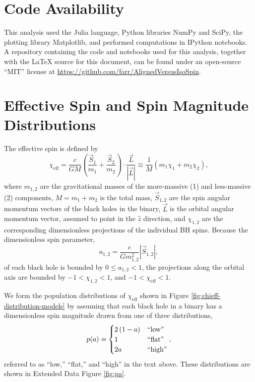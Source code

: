 \documentclass{nature}
\newcommand{\chieff}{\chi_\mathrm{eff}}
\begin{document}
\begin{methods}

\setcounter{figure}{0}
\renewcommand{\figurename}{Extended Data Figure}

\section{Code Availability}

This analysis used the Julia language\cite{Julia}, Python libraries
NumPy and SciPy\cite{NumPy,SciPy}, the plotting library
Matplotlib\cite{Matplotlib}, and performed computations in IPython
notebooks\cite{IPython}.  A repository containing the code and
notebooks used for this analysis, together with the \LaTeX{} source
for this document, can be found under an open-source ``MIT'' license
at \url{https://github.com/farr/AlignedVersusIsoSpin}.

\section{Effective Spin and Spin Magnitude Distributions}
\label{methsec:chieff-spin-magnitude}

The effective spin is defined by\cite{2016PhRvL.116x1102A} 
\begin{equation}
  \chieff = \frac{c}{GM} \left( \frac{\vec{S}_1}{m_1} + \frac{\vec{S}_2}{m_2}
  \right) \cdot \frac{\vec{L}}{\left| \vec{L} \right|} \equiv \frac{1}{M} \left( m_1 \chi_1 + m_2 \chi_2 \right),
\end{equation}
where $m_{1,2}$ are the gravitational masses of the more-massive (1)
and less-massive (2) components, $M = m_1 + m_2$ is the total mass,
$\vec{S}_{1,2}$ are the spin angular momentum vectors of the black
holes in the binary, $\vec{L}$ is the orbital angular momentum vector,
assumed to point in the $\hat{z}$ direction, and $\chi_{1,2}$ are the
corresponding dimensionless projections of the individual \ac{BH}
spins.  Because the dimensionless spin parameter,
\begin{equation}
  \label{eq:a-def}
  a_{1,2} = \frac{c}{G m_{1,2}^2} \left|\vec{S}_{1,2} \right|,
\end{equation}
of each black hole is bounded by $0 \leq a_{1,2} < 1$, the projections
along the orbital axis are bounded by $-1 < \chi_{1,2} < 1$, and
$-1 < \chieff < 1$.

We form the population distributions of $\chieff$ shown in Figure
\ref{fig:chieff-distribution-models} by assuming that each black hole
in a binary has a dimensionless spin magnitude drawn from one of three
distributions,
\begin{equation}
  \label{eq:magnitude-dists}
  p(a) = \begin{cases}
    2\left(1-a \right) & \textnormal{``low''} \\
    1 & \textnormal{``flat''} \\
    2 a & \textnormal{``high''}
  \end{cases},
\end{equation}
referred to as ``low,'' ``flat,'' and ``high'' in the text above.
These distributions are shown in Extended Data Figure \ref{fig:pa}.


\end{methods}
\end{document}
